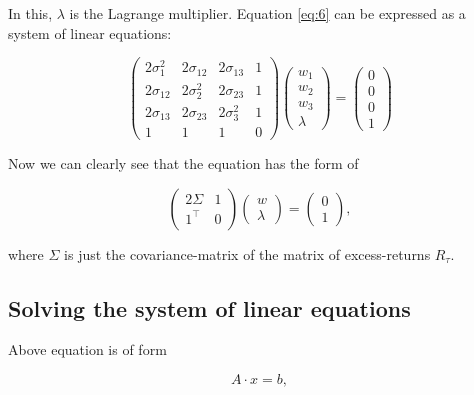 In this, $\lambda$ is the Lagrange multiplier. Equation \ref{eq:6} can be expressed as a system of linear equations:

\begin{equation} \label{eq:7}
  \begin{pmatrix}
    2\sigma_1^2 & 2\sigma_{12} & 2\sigma_{13} & 1 \\
    2\sigma_{12} & 2\sigma_{2}^2 & 2\sigma_{23} & 1 \\
    2\sigma_{13} & 2\sigma_{23} & 2\sigma_{3}^{2} & 1 \\
    1 & 1 & 1 & 0 
  \end{pmatrix}
  \begin{pmatrix}
    w_1 \\ w_2 \\ w_3 \\ \lambda
  \end{pmatrix}
   =
   \begin{pmatrix}
    0 \\ 0 \\ 0 \\ 1
   \end{pmatrix}
\end{equation}

Now we can clearly see that the equation has the form of

\begin{equation} \label{eq:8}
  \begin{pmatrix}
    2 \Sigma & 1 \\
    1^\top & 0
  \end{pmatrix}
  \begin{pmatrix}
    w \\ \lambda
  \end{pmatrix}
  =
  \begin{pmatrix}
  0 \\ 1
  \end{pmatrix},
\end{equation}

where $\Sigma$ is just the covariance-matrix of the matrix of excess-returns $R_{\tau}$.


\subsection{Solving the system of linear equations}
Above equation is of form

\begin{equation} \label{eq:9}
  A \cdot x = b,
\end{equation}

